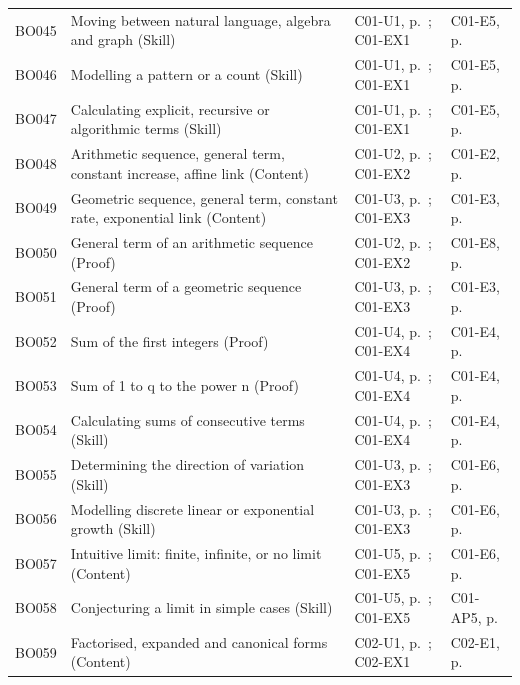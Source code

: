 \begin{longtable}{p{.1\linewidth}p{.43\linewidth}p{.19\linewidth}p{.16\linewidth}}
BO045 & Moving between natural language, algebra and graph (Skill) & C01-U1, p.\,\pageref{C01-U1} ; C01-EX1 & C01-E5, p.\,\pageref{C01-E5} \\
BO046 & Modelling a pattern or a count (Skill) & C01-U1, p.\,\pageref{C01-U1} ; C01-EX1 & C01-E5, p.\,\pageref{C01-E5} \\
BO047 & Calculating explicit, recursive or algorithmic terms (Skill) & C01-U1, p.\,\pageref{C01-U1} ; C01-EX1 & C01-E5, p.\,\pageref{C01-E5} \\
BO048 & Arithmetic sequence, general term, constant increase, affine link (Content) & C01-U2, p.\,\pageref{C01-U2} ; C01-EX2 & C01-E2, p.\,\pageref{C01-E2} \\
BO049 & Geometric sequence, general term, constant rate, exponential link (Content) & C01-U3, p.\,\pageref{C01-U3} ; C01-EX3 & C01-E3, p.\,\pageref{C01-E3} \\
BO050 & General term of an arithmetic sequence (Proof) & C01-U2, p.\,\pageref{C01-U2} ; C01-EX2 & C01-E8, p.\,\pageref{C01-E8} \\
BO051 & General term of a geometric sequence (Proof) & C01-U3, p.\,\pageref{C01-U3} ; C01-EX3 & C01-E3, p.\,\pageref{C01-E3} \\
BO052 & Sum of the first integers (Proof) & C01-U4, p.\,\pageref{C01-U4} ; C01-EX4 & C01-E4, p.\,\pageref{C01-E4} \\
BO053 & Sum of 1 to q to the power n (Proof) & C01-U4, p.\,\pageref{C01-U4} ; C01-EX4 & C01-E4, p.\,\pageref{C01-E4} \\
BO054 & Calculating sums of consecutive terms (Skill) & C01-U4, p.\,\pageref{C01-U4} ; C01-EX4 & C01-E4, p.\,\pageref{C01-E4} \\
BO055 & Determining the direction of variation (Skill) & C01-U3, p.\,\pageref{C01-U3} ; C01-EX3 & C01-E6, p.\,\pageref{C01-E6} \\
BO056 & Modelling discrete linear or exponential growth (Skill) & C01-U3, p.\,\pageref{C01-U3} ; C01-EX3 & C01-E6, p.\,\pageref{C01-E6} \\
BO057 & Intuitive limit: finite, infinite, or no limit (Content) & C01-U5, p.\,\pageref{C01-U5} ; C01-EX5 & C01-E6, p.\,\pageref{C01-E6} \\
BO058 & Conjecturing a limit in simple cases (Skill) & C01-U5, p.\,\pageref{C01-U5} ; C01-EX5 & C01-AP5, p.\,\pageref{C01-AP5} \\
BO059 & Factorised, expanded and canonical forms (Content) & C02-U1, p.\,\pageref{C02-U1} ; C02-EX1 & C02-E1, p.\,\pageref{C02-E1} \\

\end{longtable}
